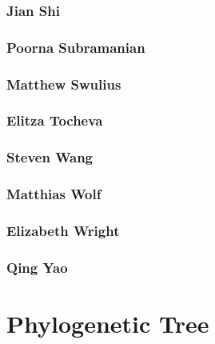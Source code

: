 \documentclass[]{tufte-book}
\begin{document}
\hypertarget{jian_shi}{%
\subsection{Jian Shi}\label{jian_shi}}

\hypertarget{poorna_subramanian}{%
\subsection{Poorna Subramanian}\label{poorna_subramanian}}

\hypertarget{matthew_swulius}{%
\subsection{Matthew Swulius}\label{matthew_swulius}}

\hypertarget{elitza_tocheva}{%
\subsection{Elitza Tocheva}\label{elitza_tocheva}}

\hypertarget{steven_wang}{%
\subsection{Steven Wang}\label{steven_wang}}

\hypertarget{matthias_wolf}{%
\subsection{Matthias Wolf}\label{matthias_wolf}}

\hypertarget{elizabeth_wright}{%
\subsection{Elizabeth Wright}\label{elizabeth_wright}}

\hypertarget{qing_yao}{%
\subsection{Qing Yao}\label{qing_yao}}

\hypertarget{phylogenetic-tree}{%
\chapter{Phylogenetic Tree}\label{phylogenetic-tree}}
\end{document}
